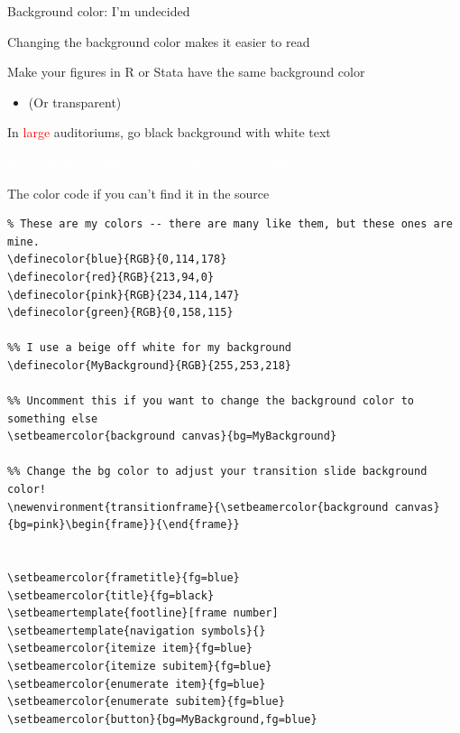 \documentclass[notes,11pt, aspectratio=169]{beamer}
\newenvironment{wideitemize}{\itemize\addtolength{\itemsep}{10pt}}{\enditemize}
\begin{document}
\begin{frame}{Background color: I'm undecided}
  \begin{wideitemize}
    \item Changing the background color makes it easier to read
    \item Make your figures in R or Stata have the same background color 
      \begin{itemize}
      \item[] (Or transparent)
      \end{itemize}
    \item In \textcolor{red}{large} auditoriums, go black background with white text
  \end{wideitemize}
\end{frame}

{  
\begin{frame}
  \textcolor{white}{Example for an auditorium -- contrast is much higher}
\end{frame}
}
\begin{frame}[fragile]{The color code if you can't find it in the source}
\tiny
\begin{verbatim}
% These are my colors -- there are many like them, but these ones are mine.
\definecolor{blue}{RGB}{0,114,178}
\definecolor{red}{RGB}{213,94,0}
\definecolor{pink}{RGB}{234,114,147}
\definecolor{green}{RGB}{0,158,115}

%% I use a beige off white for my background
\definecolor{MyBackground}{RGB}{255,253,218}

%% Uncomment this if you want to change the background color to something else
\setbeamercolor{background canvas}{bg=MyBackground}

%% Change the bg color to adjust your transition slide background color!
\newenvironment{transitionframe}{\setbeamercolor{background canvas}{bg=pink}\begin{frame}}{\end{frame}}


\setbeamercolor{frametitle}{fg=blue}
\setbeamercolor{title}{fg=black}
\setbeamertemplate{footline}[frame number]
\setbeamertemplate{navigation symbols}{} 
\setbeamercolor{itemize item}{fg=blue}
\setbeamercolor{itemize subitem}{fg=blue}
\setbeamercolor{enumerate item}{fg=blue}
\setbeamercolor{enumerate subitem}{fg=blue}
\setbeamercolor{button}{bg=MyBackground,fg=blue}
\end{verbatim}
\end{frame}
\end{document}
